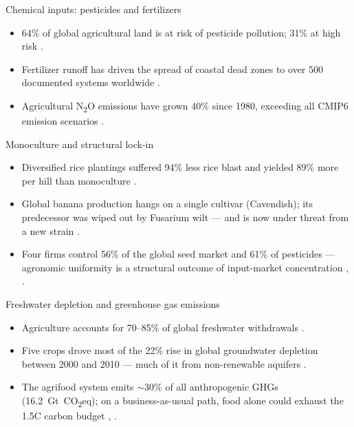 \documentclass{beamer}
\begin{document}
\begin{frame}{Chemical inputs: pesticides and fertilizers}
    \begin{itemize}
        \item 64\% of global agricultural land is at risk of pesticide pollution; 31\% at high risk \cite[206]{Tang2021}. \vspace{6mm}
        \item Fertilizer runoff has driven the spread of coastal dead zones to over 500 documented systems worldwide \cite{breitburg2018oxygen}. \vspace{6mm}
        \item Agricultural N\textsubscript{2}O emissions have grown 40\% since 1980, exceeding all CMIP6 emission scenarios \cite[Section~4.2.1]{Tian2024}.
    \end{itemize}
\end{frame}

\begin{frame}{Monoculture and structural lock-in}
    \begin{itemize}
        \item Diversified rice plantings suffered 94\% less rice blast and yielded 89\% more per hill than monoculture \cite[718--721]{zhu2000genetic}. \vspace{6mm}
        \item Global banana production hangs on a single cultivar (Cavendish); its predecessor was wiped out by Fusarium wilt --- and is now under threat from a new strain \cite[2147--2150]{kema2021vulnerability}. \vspace{6mm}
        \item Four firms control 56\% of the global seed market and 61\% of pesticides --- agronomic uniformity is a structural outcome of input-market concentration \cite{etcgroup2025agribusiness}, \cite{howard2009consolidation}.
    \end{itemize}
\end{frame}

\begin{frame}{Freshwater depletion and greenhouse gas emissions}
    \begin{itemize}
        \item Agriculture accounts for 70--85\% of global freshwater withdrawals \cite{puy2025irrigation}. \vspace{6mm}
        \item Five crops drove most of the 22\% rise in global groundwater depletion between 2000 and 2010 --- much of it from non-renewable aquifers \cite{dalin2017groundwater}. \vspace{6mm}
        \item The agrifood system emits $\sim$30\% of all anthropogenic GHGs (16.2~Gt~CO\textsubscript{2}eq); on a business-as-usual path, food alone could exhaust the 1.5\degree C carbon budget \cite{fao2024ghg}, \cite{clark2020foodclimate}.
    \end{itemize}
\end{frame}
\end{document}
